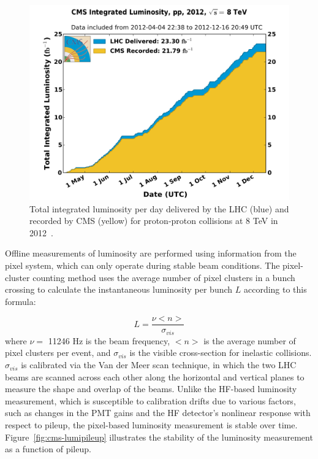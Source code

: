 \begin{figure}[hbtp]
  \begin{center}
    \includegraphics[width=1.5\cmsFigWidth]{figures/cms-lumi2012}
    \caption{Total integrated luminosity per day delivered by the LHC (blue) and recorded by CMS (yellow) for proton-proton collisions at 8 TeV in 2012~\cite{CMS-total-lumi}.}
    \label{fig:cms-lumi2012}
  \end{center}
\end{figure}

Offline measurements of luminosity are performed using information from the pixel system, which can only operate during stable beam conditions. The pixel-cluster counting method uses the average number of pixel clusters in a bunch crossing to calculate the instantaneous luminosity per bunch $L$ according to this formula:

\begin{equation}
L = \frac{\nu<n>}{\sigma_{vis}}
\label{eq:luminositycalculation}
\end{equation}
where $\nu =$ 11246 Hz is the beam frequency, $<n>$ is the average number of pixel clusters per event, and $\sigma_{vis}$ is the visible cross-section for inelastic collisions. $\sigma_{vis}$ is calibrated via the Van der Meer scan technique, in which the two LHC beams are scanned across each other along the horizontal and vertical planes to measure the shape and overlap of the beams. Unlike the HF-based luminosity measurement, which is susceptible to calibration drifts due to various factors, such as changes in the PMT gains and the HF detector's nonlinear response with respect to pileup, the pixel-based luminosity measurement is stable over time. Figure~\ref{fig:cms-lumipileup} illustrates the stability of the luminosity measurement as a function of pileup.

